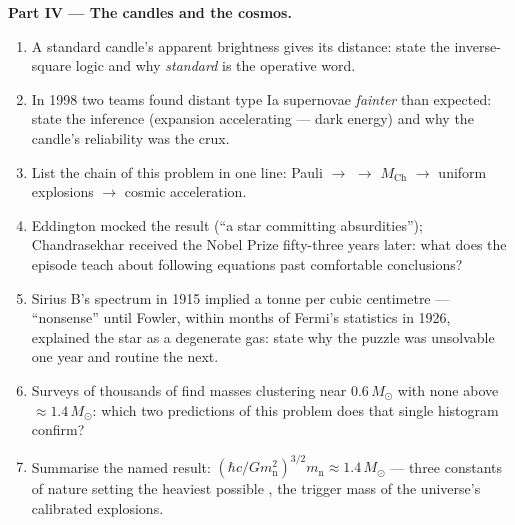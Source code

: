\begin{problem}
\medskip\noindent\textbf{Part IV --- The candles and the
cosmos.}
\begin{enumerate}[resume]
  \item A standard candle's apparent brightness gives its
        distance: state the inverse-square logic and why
        \emph{standard} is the operative word.
  \item In 1998 two teams found distant type Ia supernovae
        \emph{fainter} than expected: state the inference
        (expansion accelerating --- dark energy) and why the
        candle's reliability was the crux.
  \item List the chain of this problem in one line: Pauli $\to$
         $\to$ $M_{\text{Ch}}$ $\to$ uniform
        explosions $\to$ cosmic acceleration.
  \item Eddington mocked the result (``a star committing
        absurdities''); Chandrasekhar received the Nobel Prize
        fifty-three years later: what does the episode teach about
        following equations past comfortable conclusions?
  \item Sirius B's spectrum in 1915 implied a tonne per cubic
        centimetre --- ``nonsense'' until Fowler, within months of
        Fermi's statistics in 1926, explained the star as a
        degenerate gas: state why the puzzle was unsolvable one
        year and routine the next.
  \item Surveys of thousands of  find masses
        clustering near $0.6\,M_\odot$ with none above
        $\approx1.4\,M_\odot$: which two predictions of this
        problem does that single histogram confirm?
  \item Summarise the named result: $(\hbar c/Gm_{\text{n}}^2)^{
        3/2}m_{\text{n}} \approx 1.4\,M_\odot$ --- three constants
        of nature setting the heaviest possible , the
        trigger mass of the universe's calibrated explosions.
\end{enumerate}
\end{problem}
